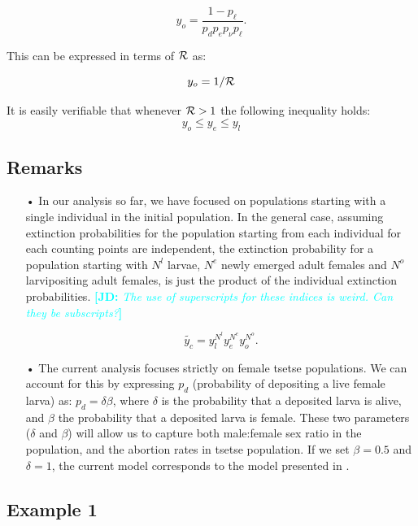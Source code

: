 \documentclass[smallextended]{svjour3}
\newcommand{\comment}[3]{\textcolor{#1}{\textbf{[#2: }\textit{#3}\textbf{]}}}
\newcommand{\jd}[1]{\comment{cyan}{JD}{#1}}
\begin{document}
$$y_o = \frac{1-p_{\ell}}{p_{d}p_{e}p_{\nu}p_{\ell}}.$$

This can be expressed in terms of ${\cal R}$ as:

\begin{equation}
	\label{matureExtinction}
	y_o = 1/{\cal R}	
\end{equation}

It is easily verifiable that whenever ${\cal R}>1$ the following inequality holds:
\begin{equation}
	\label{Aretsetsetheorem}
	y_{o}\leq y_{e} \leq y_{l}
\end{equation} 


\subsection*{\bf Remarks}
\begin{itemize}
	\item[•] In our analysis so far, we have focused on populations starting with a single individual in the initial population. In the general case, assuming extinction probabilities for the population starting from each individual for each counting points are independent, the extinction probability for a population starting with $N^l$ larvae, $N^e$ newly emerged adult females and $N^o$ larvipositing adult females, is just the product of the individual extinction probabilities. \jd{The use of superscripts for these indices is weird. Can they be subscripts?}
	
	$$\tilde{y_c}=y_l^{N^l} y_e^{N^e} y_o^{N^o}.$$

	\item[•] The current analysis focuses strictly on female tsetse populations. We can account for this  by expressing  $p_d$ (probability of depositing a live female larva) as:  $p_d =\delta \beta$, where $\delta$ is the probability that a deposited larva is alive, and $\beta$ the probability that a deposited larva is female.  These two parameters ($\delta$ and $\beta$) will allow us to capture both male:female sex ratio in the population, and  the abortion rates in tsetse population.  If we set $\beta = 0.5$ and $\delta = 1$, the current model corresponds to the model presented in \cite{Hargrove2005a}. 
\end{itemize}

\subsection{Example 1}
\end{document}
